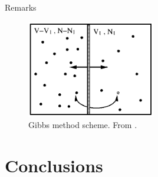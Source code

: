 \documentclass[10pt, compress, protectframetitle, handout]{beamer}
\begin{document}
\begin{frame}[allowframebreaks]{Remarks}
	\begin{figure}
		\centering
		\includegraphics[width=0.5\textwidth]{Gibbs_method}
		\caption{Gibbs method scheme. From \cite{Frenkel2002}.}
		\label{fig:Gibbs_method}
	\end{figure}
	
\end{frame}


\section{Conclusions}
\end{document}
